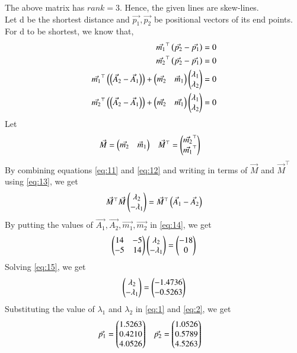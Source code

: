 \documentclass[journal,12pt,twocolumn]{IEEEtran}
\begin{document}
The above matrix has $rank = 3$. Hence, the given lines are skew-lines.\\
Let d be the shortest distance and $\Vec{p_{1}}, \Vec{p_{2}}$ be positional vectors of its end points.
For d to be shortest, we know that,
\begin{align}
    \label{eq:9}
    \Vec{m_{1}}^\top\left(\Vec{p_{2}}-\Vec{p_{1}}\right)=0\\
    \label{eq:10}
     \Vec{m_{2}}^\top\left(\Vec{p_{2}}-\Vec{p_{1}}\right)=0\\
     \label{eq:11}
     \Vec{m_{1}}^\top\left(\left(\Vec{A}_{2} - \Vec{A}_{1}\right)\right)+\begin{pmatrix}\Vec{m_{2}} & \Vec{m}_{1}\end{pmatrix}\begin{pmatrix}\lambda_{1} \\ \lambda_{2}\end{pmatrix}=0\\
     \label{eq:12}
     \Vec{m_{2}}^\top\left(\left(\Vec{A}_{2} - \Vec{A}_{1}\right)\right)+\begin{pmatrix}\Vec{m_{2}} & \Vec{m_{1}}\end{pmatrix}\begin{pmatrix}\lambda_{1} \\ \lambda_{2}\end{pmatrix}=0
\end{align}
Let 
\begin{align}
\label{eq:13}
    \Vec{M}&=\begin{pmatrix}\Vec{m_{2}} & \Vec{m}_{1}\end{pmatrix} & \Vec{M}^\top&=\begin{pmatrix}\Vec{m_{2}}^\top \\ \Vec{m_{1}}^\top\end{pmatrix}
\end{align}
By combining equations \eqref{eq:11} and \eqref{eq:12} and writing in terms of $\Vec{M}$ and $\Vec{M}^\top$ using \eqref{eq:13}, we get
\begin{align}
    \label{eq:14}
    \Vec{M}^\top\Vec{M}\begin{pmatrix}\lambda_{2} \\ -\lambda_{1}\end{pmatrix}= \Vec{M}^\top\left(\Vec{A}_{1} - \Vec{A}_{2}\right)
\end{align}
By putting the values of $\vec{A_1},\vec{A_2},\vec{m_1},\vec{m_2}$ in \eqref{eq:14}, we get
\begin{align}
    \label{eq:15}
    \begin{pmatrix}14 & -5 \\ -5 & 14\end{pmatrix}\begin{pmatrix}\lambda_{2} \\ -\lambda_{1}\end{pmatrix}=\begin{pmatrix}-18 \\ 0\end{pmatrix}
\end{align}
Solving \eqref{eq:15}, we get
\begin{align}
    \label{eq:16}
    \begin{pmatrix}\lambda_{2} \\ -\lambda_{1}\end{pmatrix}=\begin{pmatrix}-1.4736 \\ -0.5263\end{pmatrix}
\end{align}
Substituting the value of $\lambda_{1}$ and $\lambda_{2}$ in \eqref{eq:1} and \eqref{eq:2}, we get
\begin{align}
    \label{eq:17}
    \Vec{p_{1}} &= \begin{pmatrix}1.5263\\ 0.4210 \\ 4.0526 \end{pmatrix}   &    \Vec{p_{2}}&=\begin{pmatrix} 1.0526\\0.5789\\4.5263\end{pmatrix}
\end{align}
\end{document}

